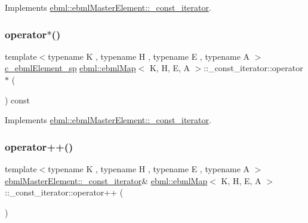 Implements \mbox{\hyperlink{classebml_1_1ebmlMasterElement_1_1__const__iterator_ac62d190e9da49236835f8219ec307d22}{ebml\+::ebml\+Master\+Element\+::\+\_\+const\+\_\+iterator}}.

\mbox{\label{classebml_1_1ebmlMap_1_1__const__iterator_a7385fe1f7e51cdf2c4c538e9cc474583}} 
\subsubsection{\texorpdfstring{operator$\ast$()}{operator*()}}
{\footnotesize\ttfamily template$<$typename K , typename H , typename E , typename A $>$ \\
\mbox{\hyperlink{namespaceebml_a2deef4e8071531b32e3533f1bf978917}{c\+\_\+ebml\+Element\+\_\+sp}} \mbox{\hyperlink{classebml_1_1ebmlMap}{ebml\+::ebml\+Map}}$<$ K, H, E, A $>$\+::\+\_\+const\+\_\+iterator\+::operator$\ast$ (\begin{DoxyParamCaption}{ }\end{DoxyParamCaption}) const\hspace{0.3cm}{\ttfamily [virtual]}}



Implements \mbox{\hyperlink{classebml_1_1ebmlMasterElement_1_1__const__iterator_aa3e5459826695a9043745fbbaea9cd47}{ebml\+::ebml\+Master\+Element\+::\+\_\+const\+\_\+iterator}}.

\mbox{\label{classebml_1_1ebmlMap_1_1__const__iterator_a7a58190879091815afc606e295afd1cf}} 
\subsubsection{\texorpdfstring{operator++()}{operator++()}}
{\footnotesize\ttfamily template$<$typename K , typename H , typename E , typename A $>$ \\
\mbox{\hyperlink{classebml_1_1ebmlMasterElement_1_1__const__iterator}{ebml\+Master\+Element\+::\+\_\+const\+\_\+iterator}}\& \mbox{\hyperlink{classebml_1_1ebmlMap}{ebml\+::ebml\+Map}}$<$ K, H, E, A $>$\+::\+\_\+const\+\_\+iterator\+::operator++ (\begin{DoxyParamCaption}{ }\end{DoxyParamCaption})\hspace{0.3cm}{\ttfamily [virtual]}}



